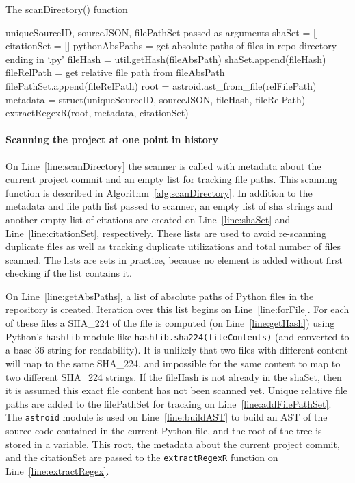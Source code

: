 \begin{algorithm}
  \caption{The scanDirectory() function}\label{alg:scanDirectory}
  \begin{algorithmic}[1]
\State uniqueSourceID, sourceJSON, filePathSet passed as arguments
\State shaSet = []\label{line:shaSet}
\State citationSet = []\label{line:citationSet}
\State pythonAbsPaths = get absolute paths of files in repo directory ending in `.py'\label{line:getAbsPaths}
\label{line:forFile}
    \State fileHash = util.getHash(fileAbsPath)\label{line:getHash}
        \State shaSet.append(fileHash)
        \State fileRelPath = get relative file path from fileAbsPath
            \State filePathSet.append(fileRelPath)\label{line:addFilePathSet}
        \EndIf
        \State root = astroid.ast\_from\_file(relFilePath)\label{line:buildAST}
        \State metadata = struct(uniqueSourceID, sourceJSON, fileHash, fileRelPath)
        \State extractRegexR(root, metadata, citationSet)\label{line:extractRegex}
    \EndIf
\EndFor
\end{algorithmic}
\end{algorithm}


\paragraph{Scanning the project at one point in history} On Line~\ref{line:scanDirectory} the scanner is called with metadata about the current project commit and an empty list for tracking file paths.  This scanning function is described in Algorithm~\ref{alg:scanDirectory}.  In addition to the metadata and file path list passed to scanner, an empty list of sha strings and another empty list of citations are created on Line~\ref{line:shaSet} and Line~\ref{line:citationSet}, respectively.  These lists are used to avoid re-scanning duplicate files as well as tracking duplicate utilizations and total number of files scanned.  The lists are sets in practice, because no element is added without first checking if the list contains it.

On Line~\ref{line:getAbsPaths}, a list of absolute paths of Python files in the repository is created.  Iteration over this list begins on Line~\ref{line:forFile}.  For each of these files a SHA\_224 of the file is computed (on Line~\ref{line:getHash}) using Python's {\tt hashlib} module like {\tt hashlib.sha224(fileContents)} (and converted to a base 36 string for readability).  It is unlikely that two files with different content will map to the same SHA\_224, and impossible for the same content to map to two different SHA\_224 strings.  If the fileHash is not already in the shaSet, then it is assumed this exact file content has not been scanned yet.  Unique relative file paths are added to the filePathSet for tracking on Line~\ref{line:addFilePathSet}.  The {\tt astroid} module is used on Line~\ref{line:buildAST} to build an AST of the source code contained in the current Python file, and the root of the tree is stored in a variable.  This root, the metadata about the current project commit, and the citationSet are passed to the {\tt extractRegexR} function on Line~\ref{line:extractRegex}.

